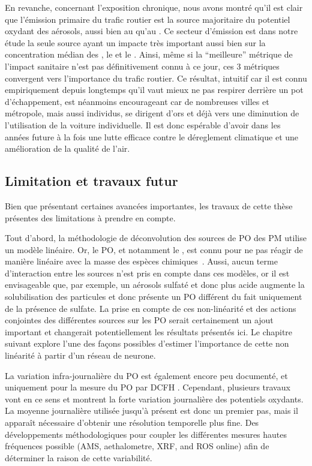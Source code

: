En revanche, concernant l'exposition chronique, nous avons montré qu'il est clair que
l'émission primaire du trafic routier est la source majoritaire du potentiel oxydant des
aérosols, aussi bien au \POAA{} qu'au \PODTT. Ce secteur d'émission est dans notre étude
la seule source ayant un impacte très important aussi bien sur la concentration médian des
\PMdix{}, le \POAAv{} et le \PODTTv.
Ainsi, même si la ``meilleure'' métrique de l'impact sanitaire n'est pas définitivement
connu à ce jour, ces 3 métriques convergent vers l'importance du trafic routier. Ce
résultat, intuitif car il est connu empiriquement depuis longtemps qu'il vaut mieux ne
pas respirer derrière un pot d'échappement, est néanmoins encourageant car de nombreuses
villes et métropole, mais aussi individus, se dirigent d'ors et déjà vers une diminution
de l'utilisation de la voiture individuelle. Il est donc espérable d'avoir dans les années
future à la fois une lutte efficace contre le déreglement climatique et une amélioration
de la qualité de l'air.

\subsection{Limitation et travaux futur}%
\label{sub:limitation_et_travaux_futur}

Bien que présentant certaines avancées importantes, les travaux de cette thèse présentes
des limitations à prendre en compte.

Tout d'abord, la méthodologie de déconvolution des sources de PO des PM utilise un modèle
linéaire. Or, le PO, et notamment le \PODTT, est connu pour ne pas réagir de manière
linéaire avec la masse des espèces
chimiques~\autocite{charrierRates2015,charrierBias2016,calasImportance2017}.
Aussi, aucun terme d'interaction entre les sources n'est pris en compte dans ces modèles, or il est
envisageable que, par exemple, un aérosols sulfaté et donc plus acide augmente la
solubilisation des particules et donc présente un PO différent du fait uniquement de la
présence de sulfate.
La prise en compte de ces non-linéarité et des actions conjointes des différentes sources 
sur les PO serait certainement un ajout important et changerait potentiellement les résultats présentés ici. Le chapitre suivant explore l'une des façons possibles d'estimer l'importance de cette non linéarité à partir d'un réseau de neurone.

La variation infra-journalière du PO est également encore peu documenté, et uniquement pour la mesure du PO par DCFH \autocite{venkatachariMeasurement2005,costabileFirst2017}. Cependant, plusieurs travaux vont en ce sens \autocite{zhouDevelopment2018,jovanovicMeasurements2019} et montrent la forte variation journalière des potentiels oxydants.
La moyenne journalière utilisée jusqu'à présent est donc un premier pas, mais il apparaît nécessaire
d'obtenir une résolution temporelle plus fine.
Des développements méthodologiques pour coupler les différentes mesures hautes fréquences possible (AMS, aethalometre, XRF, and ROS online) afin de déterminer la raison de cette variabilité.

